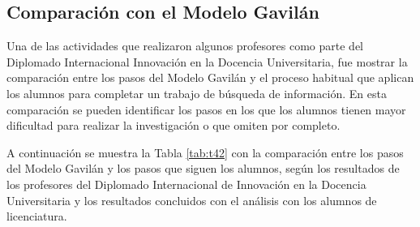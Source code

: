 
\subsection{Comparación con el Modelo Gavilán}
\label{ComparacionModeloGavilancapIV}

Una de las actividades que realizaron algunos profesores como parte del Diplomado Internacional Innovación en la Docencia Universitaria, fue mostrar la comparación entre los pasos del Modelo Gavilán y el proceso habitual que aplican los alumnos para completar un trabajo de búsqueda de información. En esta comparación se pueden identificar los pasos en los que los alumnos tienen mayor dificultad para realizar la investigación o que omiten por completo.

A continuación se muestra la Tabla \ref{tab:t42} con la comparación entre los pasos del Modelo Gavilán y los pasos que siguen los alumnos, según los resultados de los profesores del Diplomado Internacional de Innovación en la Docencia Universitaria y los resultados concluidos con el análisis con los alumnos de licenciatura.

